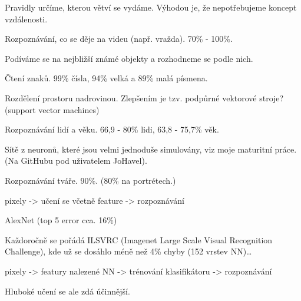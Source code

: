 \documentclass[12pt]{article}					%
\begin{document}
    \begin{definice}
        Pravidly určíme, kterou větví se vydáme. Výhodou je, že nepotřebujeme koncept vzdálenosti.
        \begin{prikladyin}
            Rozpoznávání, co se děje na videu (např. vražda). 70\% - 100\%.
        \end{prikladyin}
    \end{definice}
    
    \begin{definice}
        Podíváme se na nejbližší známé objekty a rozhodneme se podle nich.
        \begin{prikladyin}
            Čtení znaků. 99\% čísla, 94\% velká a 89\% malá písmena.
        \end{prikladyin}
    \end{definice}

    \begin{definice}
        Rozdělení prostoru nadrovinou. Zlepšením je tzv. podpůrné vektorové stroje? (support vector machines)
        \begin{prikladyin}
            Rozpoznávání lidí a věku. 66,9 - 80\% lidi, 63,8 - 75,7\% věk.
        \end{prikladyin}
    \end{definice}

    \begin{definice}
        Sítě z neuronů, které jsou velmi jednoduše simulovány, viz moje maturitní práce. (Na GitHubu pod uživatelem JoHavel).
        \begin{prikladyin}
            Rozpoznávání tváře. 90\%. (80\% na portrétech.)
        \end{prikladyin}
    \end{definice}

    \begin{poznamka}
        pixely -> učení se včetně feature -> rozpoznávání

        \begin{prikladyin}
            AlexNet (top 5 error cca. 16\%)

            Každoročně se pořádá ILSVRC (Imagenet Large Scale Visual Recognition Challenge), kde už se dosáhlo méně než 4\% chyby (152 vrstev NN)…
        \end{prikladyin}
    \end{poznamka}

    \begin{poznamka}
        pixely -> featury nalezené NN -> trénování klasifikátoru -> rozpoznávání

        Hluboké učení se ale zdá účinnější.
    \end{poznamka}
\end{document}
